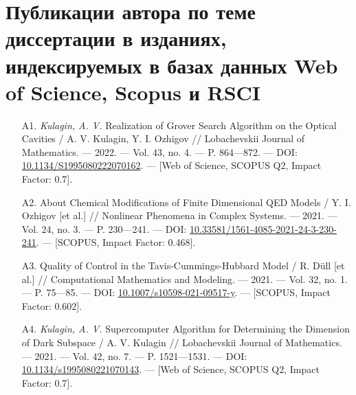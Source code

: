 \clearpage

\chapter*{
	Публикации автора по теме диссертации в изданиях, индексируемых в базах данных Web of Science, Scopus и RSCI
}
\vspace{-1em}
\hypersetup{urlcolor=blue}
{\seminormalsize
\begin{itemize}[leftmargin=24pt]
	\item[A1.]{\textit{Kulagin, A. V.} Realization of Grover Search Algorithm on the Opti­cal Cavities / A. V. Kulagin, Y. I. Ozhigov // Lobachevskii Journal of Mathematics. — 2022. — Vol. 43, no. 4. — P. 864—872. — DOI: \href{https://doi.org/10.1134/S1995080222070162}{10.1134/S1995080222070162}. — [Web of Science, SCOPUS Q2, Impact Factor: 0.7].}
	\item[A2.]{About Chemical Modifications of Finite Dimensional QED Models / Y. I. Ozhigov [et al.] // Nonlinear Phenomena in Complex Systems. — 2021. — Vol. 24, no. 3. — P. 230—241. — DOI: \href{https://doi.org/10.33581/1561-4085-2021-24-3-230-241}{10.33581/1561-4085-2021-24-3-230-241}. — [SCOPUS, Impact Factor: 0.468].}
	\item[A3.]{Quality of Control in the Tavis-Cummings-Hubbard Model / R. Düll [et al.] // Computational Mathematics and Modeling. — 2021. — Vol. 32, no. 1. — P. 75—85. — DOI: \href{https://doi.org/10.1007/s10598-021-09517-y}{10.1007/s10598-021-09517-y}. — [SCOPUS, Impact Factor: 0.602].}
	\item[A4.]{\textit{Kulagin, A. V.} Supercomputer Algorithm for Determining the Dimension of Dark Subspace / A. V. Kulagin // Lobachevskii Journal of Mathemat­ics. — 2021. — Vol. 42, no. 7. — P. 1521—1531. — DOI: \href{https://doi.org/10.1134/s1995080221070143}{10.1134/s1995080221070143}. — [Web of Science, SCOPUS Q2, Impact Factor: 0.7].}
	\end{itemize}
}
